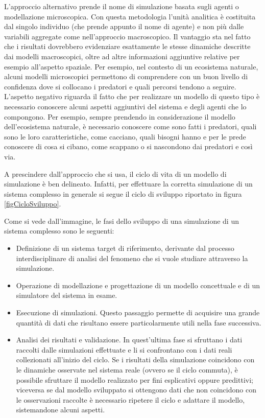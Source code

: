 \documentclass[11pt]{article}
\begin{document}
L'approccio alternativo prende il nome di simulazione basata sugli agenti o modellazione microscopica. Con questa metodologia l'unità analitica è costituita dal singolo individuo (che prende appunto il nome di agente) e non più dalle variabili aggregate come nell'approccio macroscopico. Il vantaggio sta nel fatto che i risultati dovrebbero evidenziare esattamente le stesse dinamiche descritte dai modelli macroscopici, oltre ad altre informazioni aggiuntive relative per esempio all'aspetto spaziale. Per esempio, nel contesto di un ecosistema naturale, alcuni modelli microscopici permettono di comprendere con un buon livello di confidenza dove si collocano i predatori e quali percorsi tendono a seguire. L'aspetto negativo riguarda il fatto che per realizzare un modello di questo tipo è necessario conoscere alcuni aspetti aggiuntivi del sistema e degli agenti che lo compongono. Per esempio, sempre prendendo in considerazione il modello dell'ecosistema naturale, è necessario conoscere come sono fatti i predatori, quali sono le loro caratteristiche, come cacciano, quali bisogni hanno e per le prede conoscere di cosa si cibano, come scappano o si nascondono dai predatori e così via. 

A prescindere dall'approccio che si usa, il ciclo di vita di un modello di simulazione è ben delineato. Infatti, per effettuare la corretta simulazione di un sistema complesso in generale si segue il ciclo di sviluppo riportato in figura \ref{figCicloSviluppo}.

Come si vede dall'immagine, le fasi dello sviluppo di una simulazione di un sistema complesso sono le seguenti: 
\begin{itemize}
    \item Definizione di un sistema target di riferimento, derivante dal processo interdisciplinare di analisi del fenomeno che si vuole studiare attraverso la simulazione.
    \item Operazione di modellazione e progettazione di un modello concettuale e di un simulatore del sistema in esame. 
    \item Esecuzione di simulazioni. Questo passaggio permette di acquisire una grande quantità di dati che risultano essere particolarmente utili nella fase successiva.
    \item Analisi dei risultati e validazione. In quest'ultima fase si sfruttano i dati raccolti dalle simulazioni effettuate e li si confrontano con i dati reali collezionati all'inizio del ciclo. Se i risultati della simulazione coincidono con le dinamiche osservate nel sistema reale (ovvero se il ciclo commuta), è possibile sfruttare il modello realizzato per fini esplicativi oppure predittivi; viceversa se dal modello sviluppato si ottengono dati che non coincidono con le osservazioni raccolte è necessario ripetere il ciclo e adattare il modello, sistemandone alcuni aspetti.
\end{itemize}
\end{document}
